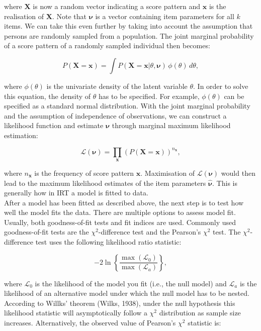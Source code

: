 \documentclass[Royal,sageapa,times,doublespace]{sagej}
\begin{document}
where $\boldsymbol{X}$ is now a random vector indicating a score pattern and $\boldsymbol{x}$ is the realisation of $\boldsymbol{X}$. Note that $\boldsymbol{\nu}$ is a vector containing item parameters for all $k$ items. We can take this even further by taking into account the assumption that persons are randomly sampled from a population. The joint marginal probability of a score pattern of a randomly sampled individual then becomes:

\begin{equation}
P(\boldsymbol{X} = \boldsymbol{x}) = \int P(\boldsymbol{X} = \boldsymbol{x} | \theta, \boldsymbol{\nu}) \,\phi(\theta)\,d\theta,
\end{equation}

where $\phi(\theta)$ is the univariate density of the latent variable $\theta$. In order to solve this equation, the density of $\theta$ has to be specified. For example, $\phi(\theta)$ can be specified as a standard normal distribution. With the joint marginal probability and the assumption of independence of observations, we can construct a likelihood function and estimate $\boldsymbol{\nu}$ through marginal maximum likelihood estimation:

\begin{equation}
\mathcal{L}(\boldsymbol{\nu}) = \prod_{\boldsymbol{x}} (P(\boldsymbol{X} = \boldsymbol{x}))^{n_{\boldsymbol{x}}},
\end{equation}

where $n_{\boldsymbol{x}}$ is the frequency of score pattern $\boldsymbol{x}$. Maximisation of $\mathcal{L}(\boldsymbol{\nu})$ would then lead to the maximum likelihood estimates of the item parameters $\boldsymbol{\hat{\nu}}$. This is generally how in IRT a model is fitted to data. \\
\indent After a model has been fitted as described above, the next step is to test how well the model fits the data. There are multiple options to assess model fit. Usually, both goodness-of-fit tests and fit indices are used. Commonly used goodness-of-fit tests are the $\chi^2$-difference test and the Pearson's $\chi^2$ test. The $\chi^2$-difference test uses the following likelihood ratio statistic:

\begin{equation}
- 2 \ln \left \{ \frac{\max(\mathcal{L}_0)}{\max(\mathcal{L}_a)} \right \},
\end{equation}

where $\mathcal{L}_0$ is the likelihood of the model you fit (i.e., the null model) and $\mathcal{L}_a$ is the likelihood of an alternative model under which the null model has to be nested. According to Willks' theorem (Wilks, 1938), under the null hypothesis this likelihood statistic will asymptotically follow a $\chi^2$ distribution as sample size increases. Alternatively, the observed value of Pearson's $\chi^2$ statistic is:
\end{document}
